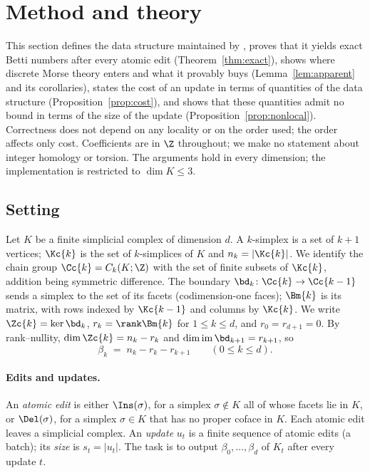 
\section{Method and theory}\label{sec:theory}

This section defines the data structure maintained by , proves
that it yields exact Betti numbers after every atomic edit
(Theorem~\ref{thm:exact}), shows where discrete Morse theory enters and what it
provably buys (Lemma~\ref{lem:apparent} and its corollaries), states the cost of
an update in terms of quantities of the data structure
(Proposition~\ref{prop:cost}), and shows that these quantities admit no bound in
terms of the size of the update (Proposition~\ref{prop:nonlocal}). Correctness
does not depend on any locality or on the order used; the order affects only
cost. Coefficients are in $\Z$ throughout; we make no statement about integer
homology or torsion. The arguments hold in every dimension; the implementation
is restricted to $\dim K\le 3$.

\subsection{Setting}\label{sec:setting}

Let $K$ be a finite simplicial complex of dimension $d$. A $k$-simplex is a set of
$k+1$ vertices; $\Kc{k}$ is the set of $k$-simplices of $K$ and $n_k=|\Kc{k}|$.
We identify the chain group $\Cc{k}=C_k(K;\Z)$ with the set of finite subsets of
$\Kc{k}$, addition being symmetric difference. The boundary
$\bd_k\colon\Cc{k}\to\Cc{k-1}$ sends a simplex to the set of its facets
(codimension-one faces); $\Bm{k}$ is its matrix, with rows indexed by
$\Kc{k-1}$ and columns by $\Kc{k}$. We write $\Zc{k}=\ker\bd_k$,
$r_k=\rank\Bm{k}$ for $1\le k\le d$, and $r_0=r_{d+1}=0$. By rank--nullity,
$\dim\Zc{k}=n_k-r_k$ and $\dim\operatorname{im}\bd_{k+1}=r_{k+1}$, so
\begin{equation}\label{eq:betti}
  \beta_k \;=\; n_k - r_k - r_{k+1}\qquad(0\le k\le d).
\end{equation}

\paragraph{Edits and updates.} An \emph{atomic edit} is either
$\Ins(\sigma)$, for a simplex $\sigma\notin K$ all of whose facets lie in $K$, or
$\Del(\sigma)$, for a simplex $\sigma\in K$ that has no proper coface in $K$.
Each atomic edit leaves a simplicial complex. An \emph{update} $u_t$ is a finite
sequence of atomic edits (a batch); its \emph{size} is $s_t=|u_t|$. The task is
to output $\beta_0,\dots,\beta_d$ of $K_t$ after every update $t$.

